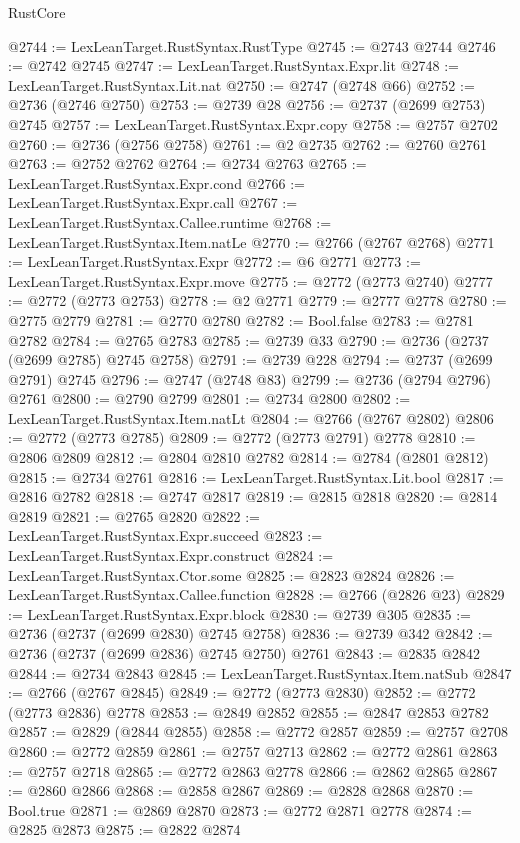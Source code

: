 \begin{lexlean}{RustCore}
\begin{coremodule}
@2744 := LexLeanTarget.RustSyntax.RustType
@2745 := @2743 @2744
@2746 := @2742 @2745
@2747 := LexLeanTarget.RustSyntax.Expr.lit
@2748 := LexLeanTarget.RustSyntax.Lit.nat
@2750 := @2747 (@2748 @66)
@2752 := @2736 (@2746 @2750)
@2753 := @2739 @28
@2756 := @2737 (@2699 @2753) @2745
@2757 := LexLeanTarget.RustSyntax.Expr.copy
@2758 := @2757 @2702
@2760 := @2736 (@2756 @2758)
@2761 := @2 @2735
@2762 := @2760 @2761
@2763 := @2752 @2762
@2764 := @2734 @2763
@2765 := LexLeanTarget.RustSyntax.Expr.cond
@2766 := LexLeanTarget.RustSyntax.Expr.call
@2767 := LexLeanTarget.RustSyntax.Callee.runtime
@2768 := LexLeanTarget.RustSyntax.Item.natLe
@2770 := @2766 (@2767 @2768)
@2771 := LexLeanTarget.RustSyntax.Expr
@2772 := @6 @2771
@2773 := LexLeanTarget.RustSyntax.Expr.move
@2775 := @2772 (@2773 @2740)
@2777 := @2772 (@2773 @2753)
@2778 := @2 @2771
@2779 := @2777 @2778
@2780 := @2775 @2779
@2781 := @2770 @2780
@2782 := Bool.false
@2783 := @2781 @2782
@2784 := @2765 @2783
@2785 := @2739 @33
@2790 := @2736 (@2737 (@2699 @2785) @2745 @2758)
@2791 := @2739 @228
@2794 := @2737 (@2699 @2791) @2745
@2796 := @2747 (@2748 @83)
@2799 := @2736 (@2794 @2796) @2761
@2800 := @2790 @2799
@2801 := @2734 @2800
@2802 := LexLeanTarget.RustSyntax.Item.natLt
@2804 := @2766 (@2767 @2802)
@2806 := @2772 (@2773 @2785)
@2809 := @2772 (@2773 @2791) @2778
@2810 := @2806 @2809
@2812 := @2804 @2810 @2782
@2814 := @2784 (@2801 @2812)
@2815 := @2734 @2761
@2816 := LexLeanTarget.RustSyntax.Lit.bool
@2817 := @2816 @2782
@2818 := @2747 @2817
@2819 := @2815 @2818
@2820 := @2814 @2819
@2821 := @2765 @2820
@2822 := LexLeanTarget.RustSyntax.Expr.succeed
@2823 := LexLeanTarget.RustSyntax.Expr.construct
@2824 := LexLeanTarget.RustSyntax.Ctor.some
@2825 := @2823 @2824
@2826 := LexLeanTarget.RustSyntax.Callee.function
@2828 := @2766 (@2826 @23)
@2829 := LexLeanTarget.RustSyntax.Expr.block
@2830 := @2739 @305
@2835 := @2736 (@2737 (@2699 @2830) @2745 @2758)
@2836 := @2739 @342
@2842 := @2736 (@2737 (@2699 @2836) @2745 @2750) @2761
@2843 := @2835 @2842
@2844 := @2734 @2843
@2845 := LexLeanTarget.RustSyntax.Item.natSub
@2847 := @2766 (@2767 @2845)
@2849 := @2772 (@2773 @2830)
@2852 := @2772 (@2773 @2836) @2778
@2853 := @2849 @2852
@2855 := @2847 @2853 @2782
@2857 := @2829 (@2844 @2855)
@2858 := @2772 @2857
@2859 := @2757 @2708
@2860 := @2772 @2859
@2861 := @2757 @2713
@2862 := @2772 @2861
@2863 := @2757 @2718
@2865 := @2772 @2863 @2778
@2866 := @2862 @2865
@2867 := @2860 @2866
@2868 := @2858 @2867
@2869 := @2828 @2868
@2870 := Bool.true
@2871 := @2869 @2870
@2873 := @2772 @2871 @2778
@2874 := @2825 @2873
@2875 := @2822 @2874

\end{coremodule}
\end{lexlean}
